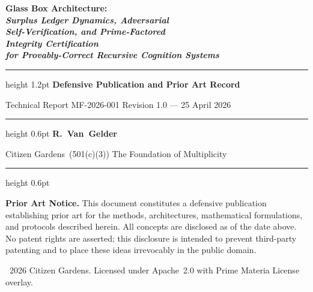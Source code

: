 \documentclass[12pt,letterpaper]{article}
\begin{document}
\begin{titlepage}
  \centering\vspace*{1.5cm}
  {\Huge\bfseries\color{mfblue}
    Glass Box Architecture:\\[0.4em]
    \large\itshape Surplus Ledger Dynamics, Adversarial\\
    Self-Verification, and Prime-Factored\\
    Integrity Certification\\[0.4em]
    \normalsize\upshape for Provably-Correct Recursive Cognition Systems
  }\par\vspace{1.2cm}
  \hrule height 1.2pt\vspace{0.5cm}
  {\large\bfseries Defensive Publication and Prior Art Record}\par\vspace{0.3cm}
  {\normalsize Technical Report MF-2026-001 \quad Revision 1.0 --- 25 April 2026}\par
  \vspace{1cm}\hrule height 0.6pt\vspace{1cm}
  {\large\bfseries R.~Van~Gelder}\par
  {\normalsize Citizen Gardens~(501(c)(3)) The Foundation of Multiplicity}\par
  \vspace{1.2cm}\hrule height 0.6pt\vspace{0.8cm}
  \begin{tcolorbox}[colback=blue!5,colframe=mfblue,width=0.85\textwidth]
    \centering\small\textbf{Prior Art Notice.}
    This document constitutes a defensive publication establishing prior art
    for the methods, architectures, mathematical formulations, and protocols
    described herein. All concepts are disclosed as of the date above.
    No patent rights are asserted; this disclosure is intended to prevent
    third-party patenting and to place these ideas irrevocably in the public domain.
  \end{tcolorbox}
  \vfill
  {\small\textcopyright~2026 Citizen Gardens.
   Licensed under Apache~2.0 with Prime Materia License overlay.}
\end{titlepage}
\end{document}
